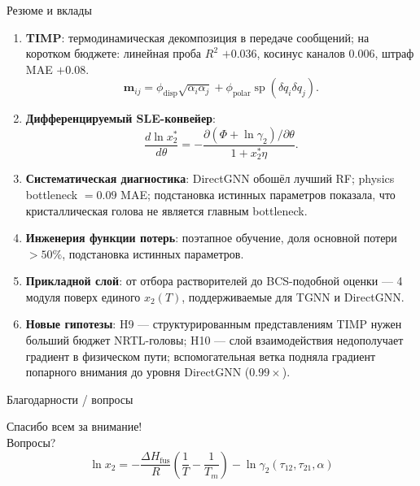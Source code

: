 \documentclass[aspectratio=169,10pt]{beamer}
\newcommand{\tightitems}{\setlength{\itemsep}{0.25em}}
\begin{document}
\begin{frame}{Резюме и вклады}
  \small
  \begin{enumerate}\tightitems
    \item \textbf{TIMP}: термодинамическая декомпозиция в передаче сообщений;
    на коротком бюджете: линейная проба $R^2$ $+0.036$, косинус каналов $0.006$,
    штраф MAE $+0.08$.
    \[
      \mathbf{m}_{ij}
      =
      \phi_{\mathrm{disp}}\sqrt{\alpha_i\alpha_j}
      +
      \phi_{\mathrm{polar}}\operatorname{sp}(\delta q_i\delta q_j).
    \]
    \item \textbf{Дифференцируемый SLE-конвейер}:
    \[
      \frac{d\ln x_2^*}{d\theta}
      =
      -\frac{\partial(\Phi+\ln\gamma_2)/\partial\theta}{1+x_2^*\eta}.
    \]
    \item \textbf{Систематическая диагностика}: DirectGNN обошёл лучший RF;
    physics bottleneck $=0.09$ MAE; подстановка истинных параметров показала, что кристаллическая голова
    не является главным bottleneck.
    \item \textbf{Инженерия функции потерь}: поэтапное обучение, доля основной потери $>50\%$, подстановка истинных параметров.
    \item \textbf{Прикладной слой}: от отбора растворителей до BCS-подобной оценки — 4 модуля поверх единого $x_2(T)$, поддерживаемые для TGNN и DirectGNN.
    \item \textbf{Новые гипотезы}: H9 — структурированным представлениям TIMP
    нужен больший бюджет NRTL-головы; H10 — слой взаимодействия недополучает
    градиент в физическом пути; вспомогательная ветка подняла градиент
    попарного внимания до уровня DirectGNN ($0.99\times$).
  \end{enumerate}
\end{frame}

\begin{frame}{Благодарности / вопросы}
  \begin{center}
    {\Large Спасибо всем за внимание!}\\[1.1em]
    {\large Вопросы?}\\[1.3em]
    \[
      \boxed{
      \ln x_2
      =
      -\frac{\Delta H_{\mathrm{fus}}}{R}
      \left(\frac{1}{T}-\frac{1}{T_m}\right)
      -
      \ln\gamma_2(\tau_{12},\tau_{21},\alpha)}
    \]
  \end{center}
\end{frame}
\end{document}
